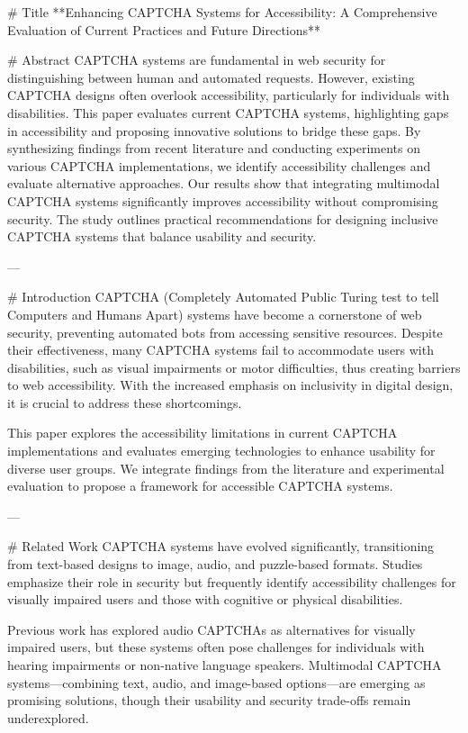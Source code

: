 # Title  
**Enhancing CAPTCHA Systems for Accessibility: A Comprehensive Evaluation of Current Practices and Future Directions**  

# Abstract  
CAPTCHA systems are fundamental in web security for distinguishing between human and automated requests. However, existing CAPTCHA designs often overlook accessibility, particularly for individuals with disabilities. This paper evaluates current CAPTCHA systems, highlighting gaps in accessibility and proposing innovative solutions to bridge these gaps. By synthesizing findings from recent literature and conducting experiments on various CAPTCHA implementations, we identify accessibility challenges and evaluate alternative approaches. Our results show that integrating multimodal CAPTCHA systems significantly improves accessibility without compromising security. The study outlines practical recommendations for designing inclusive CAPTCHA systems that balance usability and security.

---

# Introduction  
CAPTCHA (Completely Automated Public Turing test to tell Computers and Humans Apart) systems have become a cornerstone of web security, preventing automated bots from accessing sensitive resources. Despite their effectiveness, many CAPTCHA systems fail to accommodate users with disabilities, such as visual impairments or motor difficulties, thus creating barriers to web accessibility. With the increased emphasis on inclusivity in digital design, it is crucial to address these shortcomings.  

This paper explores the accessibility limitations in current CAPTCHA implementations and evaluates emerging technologies to enhance usability for diverse user groups. We integrate findings from the literature and experimental evaluation to propose a framework for accessible CAPTCHA systems.

---

# Related Work  
CAPTCHA systems have evolved significantly, transitioning from text-based designs to image, audio, and puzzle-based formats. Studies emphasize their role in security but frequently identify accessibility challenges for visually impaired users and those with cognitive or physical disabilities.  

Previous work has explored audio CAPTCHAs as alternatives for visually impaired users, but these systems often pose challenges for individuals with hearing impairments or non-native language speakers. Multimodal CAPTCHA systems—combining text, audio, and image-based options—are emerging as promising solutions, though their usability and security trade-offs remain underexplored.  


